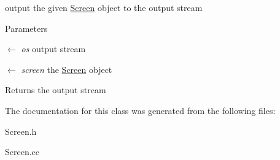 output the given \hyperlink{classScreen}{Screen} object to the output stream 
\begin{DoxyParams}{Parameters}
\item[\mbox{$\leftarrow$} {\em os}]output stream \item[\mbox{$\leftarrow$} {\em screen}]the \hyperlink{classScreen}{Screen} object \end{DoxyParams}
\begin{DoxyReturn}{Returns}
the output stream 
\end{DoxyReturn}


The documentation for this class was generated from the following files:\begin{DoxyCompactItemize}
\item 
Screen.h\item 
Screen.cc\end{DoxyCompactItemize}
